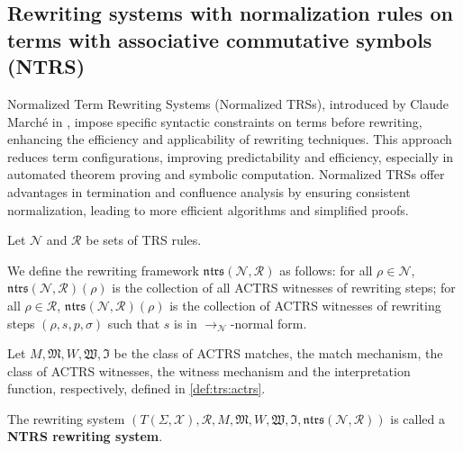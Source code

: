 
\subsection{Rewriting systems with normalization rules on terms with associative commutative symbols (NTRS)}

Normalized Term Rewriting Systems (Normalized TRSs), introduced by Claude Marché in \cite{marche1996normalized}, impose specific syntactic constraints on terms before rewriting, enhancing the efficiency and applicability of rewriting techniques. This approach reduces term configurations, improving predictability and efficiency, especially in automated theorem proving and symbolic computation. Normalized TRSs offer advantages in termination and confluence analysis by ensuring consistent normalization, leading to more efficient algorithms and simplified proofs. 


\begin{definition}
  Let $\mathcal{N}$ and $\mathcal{R}$ be sets of TRS rules.

  We define the rewriting framework $\mathfrak{ntrs}(\mathcal{N},\mathcal{R})$ as follows: for all $\rho \in \mathcal{N}$, $\mathfrak{ntrs}(\mathcal{N},\mathcal{R})(\rho)$ is the collection of all ACTRS witnesses of rewriting steps; for all $\rho \in \mathcal{R}$, $\mathfrak{ntrs}(\mathcal{N},\mathcal{R})(\rho)$ is the collection of ACTRS witnesses of rewriting steps $(\rho, s, p, \sigma)$ such that $s$ is in $\to_\mathcal{N}$-normal form.

  Let $M, \mathfrak{M}, W, \mathfrak{W}, \mathfrak{I}$ be the class of ACTRS matches, the match mechanism, the class of ACTRS witnesses, the witness mechanism and the interpretation function, respectively, defined in \autoref{def:trs:actrs}.

  The rewriting system $(T(\Sigma,\mathcal{X}), \mathcal{R}, M, \mathfrak{M}, W, \mathfrak{W}, \mathfrak{I}, \mathfrak{ntrs}(\mathcal{N},\mathcal{R}))$ is called a \textbf{NTRS rewriting system}.
\end{definition}
